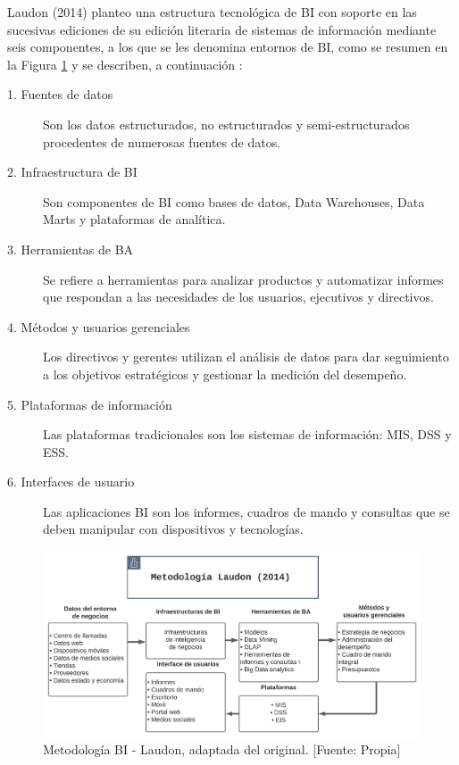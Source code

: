 \documentclass[11pt,titlepage]{report}
\begin{document}
Laudon (2014) planteo una estructura tecnológica de BI con soporte en las sucesivas ediciones de su edición literaria de sistemas de información mediante seis componentes, a los que se les denomina entornos de BI, como se resumen en la Figura \ref{fig: metLaudon} y se describen, a continuación \cite{lib02}:

\begin{description}
\item[1. Fuentes de datos] 
Son los datos estructurados, no estructurados y semi-estructurados procedentes de numerosas fuentes de datos.

\item[2. Infraestructura de BI]
Son componentes de BI como bases de datos, Data Warehouses, Data Marts y
plataformas de analítica.

\item[3. Herramientas de BA]
Se refiere a herramientas para analizar productos y automatizar informes que respondan a las necesidades de los usuarios, ejecutivos y directivos.

\item[4. Métodos y usuarios gerenciales]
Los directivos y gerentes utilizan el análisis de datos para dar seguimiento a los objetivos estratégicos y gestionar la medición del desempeño.

\item[5. Plataformas de información]
Las plataformas tradicionales son los sistemas de información: MIS, DSS y ESS.

\item[6. Interfaces de usuario]
Las aplicaciones BI son los informes, cuadros de mando y consultas que se deben manipular con dispositivos y tecnologías.
\end{description}

\begin{figure}[h]
	\centering
	\includegraphics[width=1.08\linewidth]{Figuras/MetLaudon}
	\caption{Metodología BI - Laudon, adaptada del original. [Fuente: Propia]}
	\label{fig: metLaudon}
\end{figure}
\end{document}

